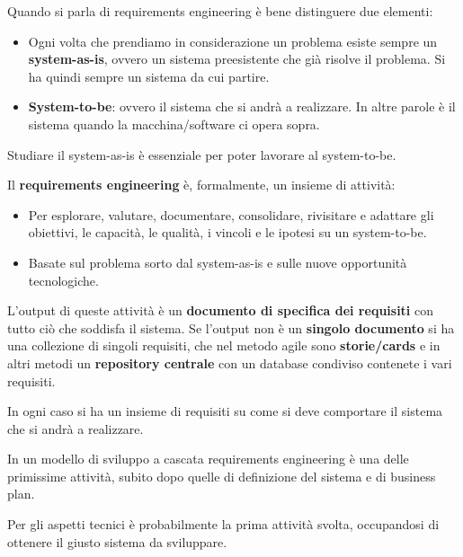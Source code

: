 Quando si parla di requirements engineering è bene distinguere due elementi:
\begin{itemize}
      \item Ogni volta che prendiamo in considerazione un problema esiste sempre
            un \textbf{system-as-is}, ovvero un sistema preesistente che già
            risolve il problema. Si ha quindi sempre un sistema da cui partire.
      \item \textbf{System-to-be}: ovvero il sistema che si andrà a realizzare.
            In altre parole è il sistema quando la macchina/software ci opera sopra.
\end{itemize}
Studiare il system-as-is è essenziale per poter lavorare al system-to-be.
\begin{definizione}
      Il \textbf{requirements engineering} è, formalmente, un insieme di attività:
      \begin{itemize}
            \item Per esplorare, valutare, documentare, consolidare, rivisitare
                  e adattare gli obiettivi, le capacità, le qualità, i vincoli e
                  le ipotesi su un system-to-be.
            \item Basate sul problema sorto dal system-as-is e sulle nuove
                  opportunità tecnologiche.
      \end{itemize}
      L'output di queste attività è un \textbf{documento di specifica dei requisiti}
      con tutto ciò che soddisfa il sistema. Se l'output non è un \textbf{singolo
            documento} si ha una collezione di singoli requisiti, che nel metodo
      agile sono \textbf{storie/cards} e in altri metodi un \textbf{repository
            centrale} con un database condiviso contenete i vari requisiti.

      In ogni caso si ha un insieme di requisiti su come si deve comportare il
      sistema che si andrà a realizzare.
\end{definizione}
In un modello di sviluppo a cascata requirements engineering è una delle
primissime attività, subito dopo quelle di definizione del sistema e di business
plan.

Per gli aspetti tecnici è probabilmente la prima attività svolta, occupandosi di
ottenere il giusto sistema da sviluppare.

